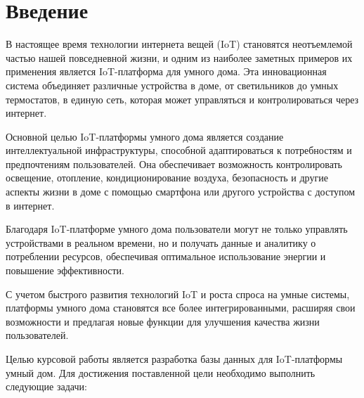 \chapter*{Введение}

В настоящее время технологии интернета вещей (IoT) становятся 
неотъемлемой частью нашей повседневной жизни, и одним из наиболее 
заметных примеров их применения является IoT-платформа для умного дома. 
Эта инновационная система объединяет различные устройства в доме, от 
светильников до умных термостатов, в единую сеть, которая может 
управляться и контролироваться через интернет.

Основной целью IoT-платформы умного дома является создание 
интеллектуальной инфраструктуры, способной адаптироваться к 
потребностям и предпочтениям пользователей. Она обеспечивает 
возможность контролировать освещение, отопление, кондиционирование 
воздуха, безопасность и другие аспекты жизни в доме с помощью смартфона 
или другого устройства с доступом в интернет.

Благодаря IoT-платформе умного дома пользователи могут не только 
управлять устройствами в реальном времени, но и получать данные и 
аналитику о потреблении ресурсов, обеспечивая оптимальное использование 
энергии и повышение эффективности.

С учетом быстрого развития технологий IoT и роста спроса на умные 
системы, платформы умного дома становятся все более интегрированными, 
расширяя свои возможности и предлагая новые функции для улучшения 
качества жизни пользователей.

Целью курсовой работы является разработка базы данных для IoT-платформы умный дом. 
Для достижения поставленной цели необходимо выполнить следующие задачи:

